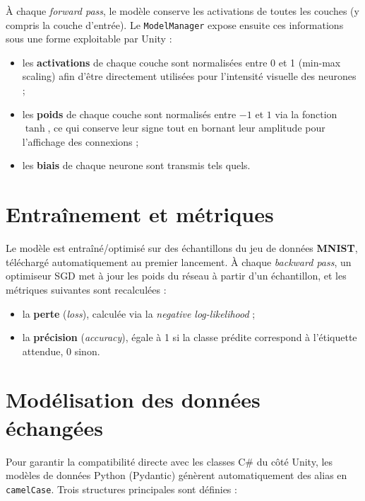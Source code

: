 \documentclass[12pt,a4paper]{report}
\begin{document}
\`A chaque \textit{forward pass}, le mod\`ele conserve les activations de
toutes les couches (y compris la couche d'entr\'ee). Le
\texttt{ModelManager} expose ensuite ces informations sous une forme
exploitable par Unity :

\begin{itemize}
    \item les \textbf{activations} de chaque couche sont normalis\'ees entre
    0 et 1 (min-max scaling) afin d'\^etre directement utilis\'ees pour
    l'intensit\'e visuelle des neurones ;
    \item les \textbf{poids} de chaque couche sont normalis\'es entre $-1$ et
    $1$ via la fonction $\tanh$, ce qui conserve leur signe tout en bornant
    leur amplitude pour l'affichage des connexions ;
    \item les \textbf{biais} de chaque neurone sont transmis tels quels.
\end{itemize}

\section{Entra\^inement et m\'etriques}

Le mod\`ele est entra\^in\'e/optimis\'e sur des \'echantillons du jeu de
donn\'ees \textbf{MNIST}, t\'el\'echarg\'e automatiquement au premier
lancement. \`A chaque \textit{backward pass}, un optimiseur SGD met \`a jour
les poids du r\'eseau \`a partir d'un \'echantillon, et les m\'etriques
suivantes sont recalcul\'ees :

\begin{itemize}
    \item la \textbf{perte} (\textit{loss}), calcul\'ee via la
    \textit{negative log-likelihood} ;
    \item la \textbf{pr\'ecision} (\textit{accuracy}), \'egale \`a 1 si la
    classe pr\'edite correspond \`a l'\'etiquette attendue, 0 sinon.
\end{itemize}

\section{Mod\'elisation des donn\'ees \'echang\'ees}

Pour garantir la compatibilit\'e directe avec les classes C\# du c\^ot\'e
Unity, les mod\`eles de donn\'ees Python (Pydantic) g\'en\`erent
automatiquement des alias en \texttt{camelCase}. Trois structures
principales sont d\'efinies :
\end{document}
